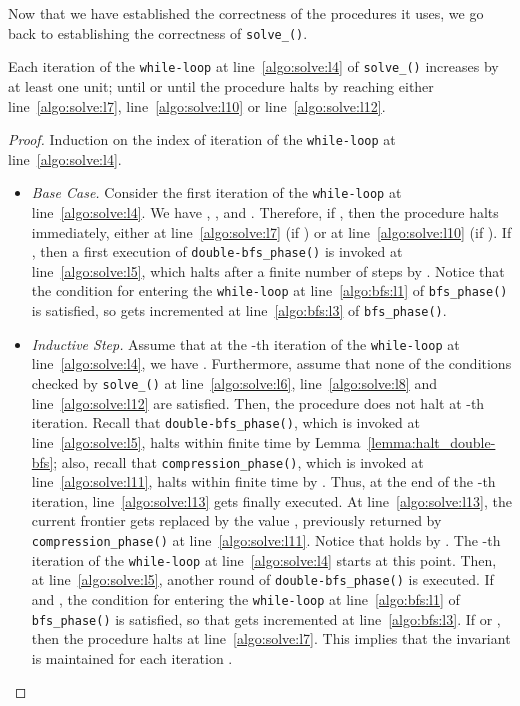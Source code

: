 Now that we have established the correctness of the procedures it uses, we go back to establishing the correctness of \texttt{solve\_\mainproblem()}.

\begin{lemma}\label{lemma:pre_solve_halts_finite}
Each iteration of the \texttt{while-loop} at line~\ref{algo:solve:l4} of \texttt{solve\_\mainproblem()}
increases  by at least one unit;
until  or until the procedure halts by reaching
either line~\ref{algo:solve:l7}, line~\ref{algo:solve:l10} or line~\ref{algo:solve:l12}.
\end{lemma}
\begin{proof} Induction on the index 
of iteration of the \texttt{while-loop} at line~\ref{algo:solve:l4}.
\begin{itemize}
\item \emph{Base Case.} Consider the first iteration of the \texttt{while-loop} at line~\ref{algo:solve:l4}.
We have , , and .
Therefore, if , then the procedure halts immediately,
either at line~\ref{algo:solve:l7} (if ) or at line~\ref{algo:solve:l10} (if ).
If , then a first execution of \texttt{double-bfs\_phase()}
is invoked at line~\ref{algo:solve:l5}, which halts after a finite number of steps by .
Notice that the condition for entering  the \texttt{while-loop}
at line~\ref{algo:bfs:l1} of \texttt{bfs\_phase()} is satisfied, so
 gets incremented at line~\ref{algo:bfs:l3} of \texttt{bfs\_phase()}.

\item \emph{Inductive Step.}
Assume that at the -th iteration of the \texttt{while-loop} at line~\ref{algo:solve:l4},
we have . Furthermore, assume that none of the conditions
checked by \texttt{solve\_{\mainproblem}()} at line~\ref{algo:solve:l6},
line~\ref{algo:solve:l8} and line~\ref{algo:solve:l12} are satisfied.
Then, the procedure does not halt at -th iteration.
Recall that \texttt{double-bfs\_phase()}, which is invoked at line~\ref{algo:solve:l5},
halts within finite time by Lemma~\ref{lemma:halt_double-bfs};
also, recall that \texttt{compression\_phase()}, which is invoked at line~\ref{algo:solve:l11},
halts within finite time by .
Thus, at the end of the -th iteration, line~\ref{algo:solve:l13} gets finally executed.
At line~\ref{algo:solve:l13}, the current frontier  gets replaced by the value ,
previously returned by \texttt{compression\_phase()} at line~\ref{algo:solve:l11}.
Notice that  holds by .
The -th iteration of the \texttt{while-loop} at line~\ref{algo:solve:l4} starts at this point.
Then, at line~\ref{algo:solve:l5}, another round of \texttt{double-bfs\_phase()} is executed.
If  and ,
the condition for entering the \texttt{while-loop} at line~\ref{algo:bfs:l1} of \texttt{bfs\_phase()} is satisfied,
so that  gets incremented at line~\ref{algo:bfs:l3}.
If  or ,
then the procedure halts at line~\ref{algo:solve:l7}.
This implies that the invariant is maintained for each iteration .
\end{itemize}
\end{proof}

